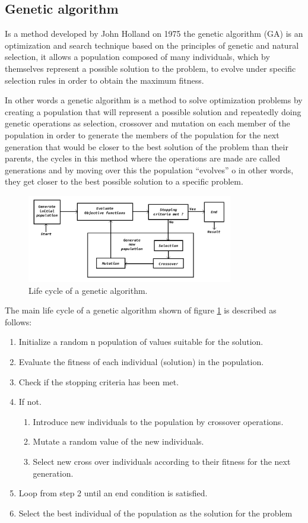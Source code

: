 \documentclass[conference]{IEEEtran}
\begin{document}
\subsection{Genetic algorithm}
Is a method developed by John Holland on 1975 \cite{Holland1975} the genetic
algorithm (GA) is an optimization and search technique based on the principles
of genetic and natural selection, it allows a population composed of many
individuals, which by themselves represent a possible solution to the problem,
to evolve under specific selection rules in order to obtain the maximum fitness.

In other words a genetic algorithm is a method to solve optimization problems by
creating a population that will represent a possible solution and repeatedly
doing genetic operations as selection, crossover and mutation on each member of
the population in order to generate the members of the population for the next
generation that would be closer to the best solution of the problem than their
parents, the cycles in this method where the operations are made are called
generations and by moving over this the population “evolves” o in other words,
they get closer to the best possible solution  to a specific problem.

\begin{figure}[htbp]
\centerline{\includegraphics[width=90mm]{Images/ga_life_cycle.png}}
\caption{Life cycle of a genetic algorithm.}
\label{algorithm_model}
\end{figure}

The main life cycle of a genetic algorithm shown of figure \ref{algorithm_model}
is described as follows:
\begin{enumerate}
    \item Initialize a random n population of values suitable for the solution.
    \item Evaluate the fitness of each individual (solution) in the population.
    \item Check if the stopping criteria has been met.
    \item If not.
    \begin{enumerate}
        \item Introduce new individuals to the population by crossover
        operations.
        \item Mutate a random value of the new individuals.
        \item Select new cross over individuals according to their fitness for
        the next generation.
    \end{enumerate}
    \item Loop from step 2 until an end condition is satisfied.
    \item Select the best individual of the population as the solution for the
    problem
\end{enumerate}
\end{document}
